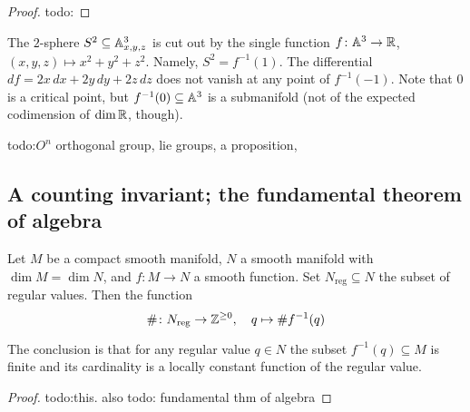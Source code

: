     \begin{proof}
        {\color{red}todo:} 
    \end{proof}
\begin{example}
    The $2$-sphere $S^2 \subseteq \mathbb{A}^3_{x,y,z}$ is cut out by the single function $f \colon \mathbb{A}^3 \to \mathbb{R}$, $(x,y,z) \mapsto x^2+y^2+z^2$. Namely, $S^2=f^{-1}(1)$. The differential $df=2x \,dx+2y \,dy+2z\, dz$ does not vanish at any point of $f ^{-1}(-1)$. Note that $0$ is a critical point, but $f ^{-1}(0) \subseteq \mathbb{A}^3$ is a submanifold (not of the expected codimension of $\dim \mathbb{R}$, though).
\end{example}
\begin{example}
    {\color{red}todo:$O^n $ orthogonal group, lie groups, a proposition,}
\end{example}

\subsection{A counting invariant; the fundamental theorem of algebra}
\begin{theorem}
    Let $M$ be a compact smooth manifold, $N$ a smooth manifold with $\dim M=\dim N$, and  $f \colon M \to N$ a smooth function. Set $N _{\text{reg} }\subseteq N$ the subset of regular values. Then the function \[
        \# \colon N_{\text{reg} } \to \mathbb{Z}^{\geq 0}, \quad q \mapsto \# f ^{-1}(q)
    \] 
\end{theorem}
The conclusion is that for any regular value $q \in N$ the subset $f^{-1}(q)\subseteq M$ is finite and its cardinality is a locally constant function of the regular value.
\begin{proof}
    {\color{red}todo:this. also todo: fundamental thm of algebra} 
\end{proof}
